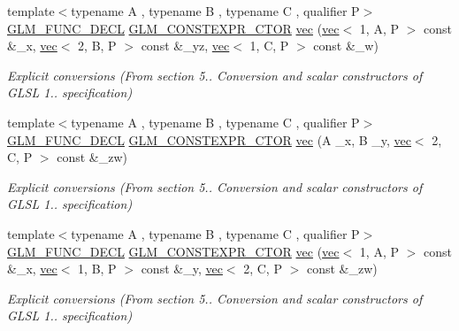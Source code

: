 \begin{DoxyCompactItemize}
{\footnotesize template$<$typename A , typename B , typename C , qualifier P$>$ }\\\mbox{\hyperlink{setup_8hpp_ab2d052de21a70539923e9bcbf6e83a51}{G\+L\+M\+\_\+\+F\+U\+N\+C\+\_\+\+D\+E\+CL}} \mbox{\hyperlink{setup_8hpp_ad34178a09666081abdb573c14d1f4a5a}{G\+L\+M\+\_\+\+C\+O\+N\+S\+T\+E\+X\+P\+R\+\_\+\+C\+T\+OR}} \mbox{\hyperlink{structglm_1_1vec_3_014_00_01_t_00_01_q_01_4_ab79395a0ba268369e6c49872b4385b27}{vec}} (\mbox{\hyperlink{structglm_1_1vec}{vec}}$<$ 1, A, P $>$ const \&\+\_\+x, \mbox{\hyperlink{structglm_1_1vec}{vec}}$<$ 2, B, P $>$ const \&\+\_\+yz, \mbox{\hyperlink{structglm_1_1vec}{vec}}$<$ 1, C, P $>$ const \&\+\_\+w)
\begin{DoxyCompactList}\small\item\em Explicit conversions (From section 5.. Conversion and scalar constructors of G\+L\+SL 1.. specification) \end{DoxyCompactList}\item 
{\footnotesize template$<$typename A , typename B , typename C , qualifier P$>$ }\\\mbox{\hyperlink{setup_8hpp_ab2d052de21a70539923e9bcbf6e83a51}{G\+L\+M\+\_\+\+F\+U\+N\+C\+\_\+\+D\+E\+CL}} \mbox{\hyperlink{setup_8hpp_ad34178a09666081abdb573c14d1f4a5a}{G\+L\+M\+\_\+\+C\+O\+N\+S\+T\+E\+X\+P\+R\+\_\+\+C\+T\+OR}} \mbox{\hyperlink{structglm_1_1vec_3_014_00_01_t_00_01_q_01_4_a5102bf3529e597f13aa16031b1fd71aa}{vec}} (A \+\_\+x, B \+\_\+y, \mbox{\hyperlink{structglm_1_1vec}{vec}}$<$ 2, C, P $>$ const \&\+\_\+zw)
\begin{DoxyCompactList}\small\item\em Explicit conversions (From section 5.. Conversion and scalar constructors of G\+L\+SL 1.. specification) \end{DoxyCompactList}\item 
{\footnotesize template$<$typename A , typename B , typename C , qualifier P$>$ }\\\mbox{\hyperlink{setup_8hpp_ab2d052de21a70539923e9bcbf6e83a51}{G\+L\+M\+\_\+\+F\+U\+N\+C\+\_\+\+D\+E\+CL}} \mbox{\hyperlink{setup_8hpp_ad34178a09666081abdb573c14d1f4a5a}{G\+L\+M\+\_\+\+C\+O\+N\+S\+T\+E\+X\+P\+R\+\_\+\+C\+T\+OR}} \mbox{\hyperlink{structglm_1_1vec_3_014_00_01_t_00_01_q_01_4_adee69249b84755de6d21c4b5aba9af0c}{vec}} (\mbox{\hyperlink{structglm_1_1vec}{vec}}$<$ 1, A, P $>$ const \&\+\_\+x, \mbox{\hyperlink{structglm_1_1vec}{vec}}$<$ 1, B, P $>$ const \&\+\_\+y, \mbox{\hyperlink{structglm_1_1vec}{vec}}$<$ 2, C, P $>$ const \&\+\_\+zw)
\begin{DoxyCompactList}\small\item\em Explicit conversions (From section 5.. Conversion and scalar constructors of G\+L\+SL 1.. specification) \end{DoxyCompactList}\item 

\end{DoxyCompactItemize}

